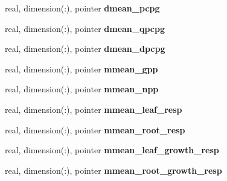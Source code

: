 \begin{DoxyCompactItemize}
\item 
\hypertarget{structed__state__vars_1_1edtype_a4192a59c971541ffaf7f0a584f634380}{
real, dimension(:), pointer {\bfseries dmean\_\-pcpg}}
\label{structed__state__vars_1_1edtype_a4192a59c971541ffaf7f0a584f634380}

\item 
\hypertarget{structed__state__vars_1_1edtype_a10ece8c01e0b5bf6b50c3179c65a45aa}{
real, dimension(:), pointer {\bfseries dmean\_\-qpcpg}}
\label{structed__state__vars_1_1edtype_a10ece8c01e0b5bf6b50c3179c65a45aa}

\item 
\hypertarget{structed__state__vars_1_1edtype_a8100bc01a148a412fdcbaf4872ed8bc4}{
real, dimension(:), pointer {\bfseries dmean\_\-dpcpg}}
\label{structed__state__vars_1_1edtype_a8100bc01a148a412fdcbaf4872ed8bc4}

\item 
\hypertarget{structed__state__vars_1_1edtype_ac11d8c3c3fc67c0da1ae170bd529bc51}{
real, dimension(:), pointer {\bfseries mmean\_\-gpp}}
\label{structed__state__vars_1_1edtype_ac11d8c3c3fc67c0da1ae170bd529bc51}

\item 
\hypertarget{structed__state__vars_1_1edtype_a6da732a8b31a9e807a469728e9d3d21e}{
real, dimension(:), pointer {\bfseries mmean\_\-npp}}
\label{structed__state__vars_1_1edtype_a6da732a8b31a9e807a469728e9d3d21e}

\item 
\hypertarget{structed__state__vars_1_1edtype_a637d91e4d2480509776250a900a81ba5}{
real, dimension(:), pointer {\bfseries mmean\_\-leaf\_\-resp}}
\label{structed__state__vars_1_1edtype_a637d91e4d2480509776250a900a81ba5}

\item 
\hypertarget{structed__state__vars_1_1edtype_a031e7cad8546eff73effdbed0456d960}{
real, dimension(:), pointer {\bfseries mmean\_\-root\_\-resp}}
\label{structed__state__vars_1_1edtype_a031e7cad8546eff73effdbed0456d960}

\item 
\hypertarget{structed__state__vars_1_1edtype_af96d087230ce5ec2df4cc9d430682049}{
real, dimension(:), pointer {\bfseries mmean\_\-leaf\_\-growth\_\-resp}}
\label{structed__state__vars_1_1edtype_af96d087230ce5ec2df4cc9d430682049}

\item 
\hypertarget{structed__state__vars_1_1edtype_ac1baeb51d3a4b8e43e917c5528af725a}{
real, dimension(:), pointer {\bfseries mmean\_\-root\_\-growth\_\-resp}}
\label{structed__state__vars_1_1edtype_ac1baeb51d3a4b8e43e917c5528af725a}


\end{DoxyCompactItemize}
